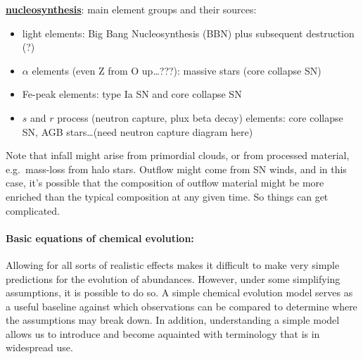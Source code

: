 \documentclass{article}
\begin{document}
\textbf{\underline{nucleosynthesis}}: main element groups and their sources:
\begin{itemize}
    \item light elements: Big Bang Nucleosynthesis (BBN)
        plus subsequent destruction (?)
    \item $\alpha$ elements (even Z from O up\ldots???): massive stars (core
        collapse SN)
    \item Fe-peak elements: type Ia SN and core collapse SN
    \item $s$ and $r$ process (neutron capture, plux beta decay) elements: core
        collapse SN, AGB stars\ldots (need neutron capture diagram here)
\end{itemize} %
Note that infall might arise from primordial clouds, or from processed
material, e.g.\ mass-loss from halo stars. Outflow might come from SN winds,
and in this case, it's possible that the composition of outflow material might
be more enriched than the typical composition at any given time. So things can
get complicated.

\paragraph{Basic equations of chemical evolution:}
Allowing for all sorts of realistic effects makes it difficult to make
very simple predictions for the evolution of abundances. However, under
some simplifying assumptions, it is possible to do so. A simple chemical
evolution model serves as a useful baseline against which observations
can be compared to determine where the assumptions may break down.
In addition, understanding a simple model allows us to introduce and
become aquainted with terminology that is in widespread use.
\end{document}
